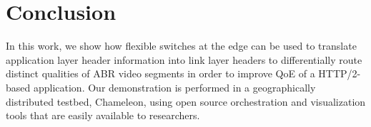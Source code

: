 \section{Conclusion}
\label{sec:conclusion}
In this work, we show how flexible switches at the edge can be used to translate application layer header information into link layer headers to differentially route distinct qualities of ABR video segments in order to improve QoE of a HTTP/2-based application. Our demonstration is performed in a geographically distributed testbed, Chameleon, using open source orchestration and visualization tools that are easily available to researchers. 

